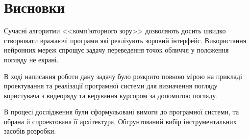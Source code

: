\section*{Висновки}
Сучасні алгоритми <<комп'юторного зору>> дозволяють досить швидко створювати вражаючі програми які реалізують зоровий інтерфейс.
Використання нейронних мереж спрощує задачу переведення точок обличчя у положення погляду не екрані.

В ході написання роботи дану задачу було розкрито повною мірою на прикладі проектування та реалізації програмної системи для визначення погляду користувача з видеоряду та керування курсором за допомогою погляду. 

В процесі дослідження були сформульовані вимоги до програмної системи, та обрана й спроектована її архітектура.
Обгрунтований вибір інструментальних засобів розробки.
